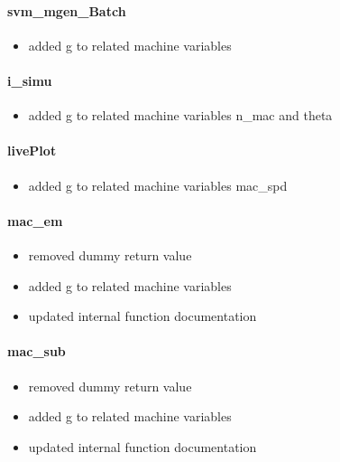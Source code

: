 \documentclass[12pt]{article}
\begin{document}
\paragraph{svm\_mgen\_Batch}
	\begin{itemize}
		\item  added g to related machine variables
	\end{itemize}

\paragraph{i\_simu}
	\begin{itemize}
		\item added g to related machine variables n\_mac and theta
	\end{itemize}

\paragraph{livePlot}
	\begin{itemize}
		\item  added g to related machine variables mac\_spd
	\end{itemize}

\paragraph{mac\_em}
	\begin{itemize}
		\item removed dummy return value
		\item added g to related machine variables
		\item updated internal function documentation
	\end{itemize}

\paragraph{mac\_sub}
	\begin{itemize}
		\item removed dummy return value
		\item added g to related machine variables
		\item updated internal function documentation
	\end{itemize}
\end{document}
